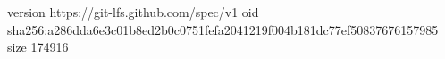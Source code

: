 version https://git-lfs.github.com/spec/v1
oid sha256:a286dda6e3c01b8ed2b0c0751fefa2041219f004b181dc77ef50837676157985
size 174916
